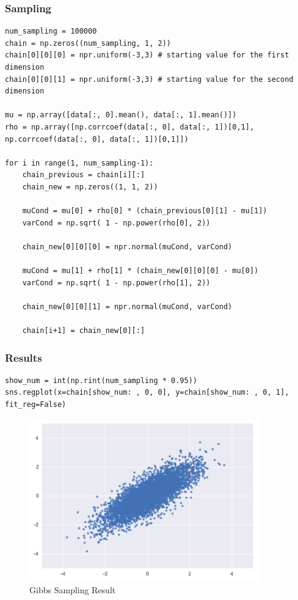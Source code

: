 \documentclass[a4paper,10.5pt,uplatex]{jsarticle}  %
\begin{document}
\subsubsection{Sampling}
\begin{lstlisting}
num_sampling = 100000
chain = np.zeros((num_sampling, 1, 2))
chain[0][0][0] = npr.uniform(-3,3) # starting value for the first dimension
chain[0][0][1] = npr.uniform(-3,3) # starting value for the second dimension

mu = np.array([data[:, 0].mean(), data[:, 1].mean()])
rho = np.array([np.corrcoef(data[:, 0], data[:, 1])[0,1], np.corrcoef(data[:, 0], data[:, 1])[0,1]])

for i in range(1, num_sampling-1):
    chain_previous = chain[i][:]
    chain_new = np.zeros((1, 1, 2))
    
    muCond = mu[0] + rho[0] * (chain_previous[0][1] - mu[1])
    varCond = np.sqrt( 1 - np.power(rho[0], 2))

    chain_new[0][0][0] = npr.normal(muCond, varCond)
    
    muCond = mu[1] + rho[1] * (chain_new[0][0][0] - mu[0])
    varCond = np.sqrt( 1 - np.power(rho[1], 2))

    chain_new[0][0][1] = npr.normal(muCond, varCond)
            
    chain[i+1] = chain_new[0][:]
\end{lstlisting}

\subsubsection{Results}
\begin{lstlisting}
show_num = int(np.rint(num_sampling * 0.95))
sns.regplot(x=chain[show_num: , 0, 0], y=chain[show_num: , 0, 1], fit_reg=False)
\end{lstlisting}

\begin{figure}[H]
\centering
\includegraphics[width=10.0cm]{Gibbs-result.pdf}
\caption{Gibbs Sampling Result}
\end{figure}
\end{document}
